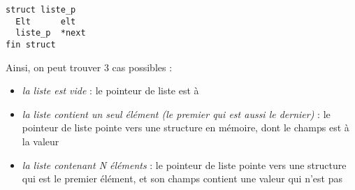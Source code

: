 \documentclass[11pt,a4paper]{article}
\begin{document}
\begin{center}
\begin{lstlisting}[style=algorithmique]
struct liste_p
  Elt      elt
  liste_p  *next
fin struct \end{lstlisting}
\end{center}

Ainsi, on peut trouver 3 cas possibles :
\begin{itemize}
\item \textit{la liste est vide} : le pointeur de liste est à 
\item \textit{la liste contient un seul élément (le premier qui est aussi le dernier)} : le pointeur de liste pointe vers une structure en mémoire, dont le champs  est à la valeur 
\item \textit{la liste contenant N éléments} : le pointeur de liste pointe vers une structure qui est le premier élément, et son champs  contient une valeur qui n'est pas 
\end{itemize}


\bigskip


\end{document}
